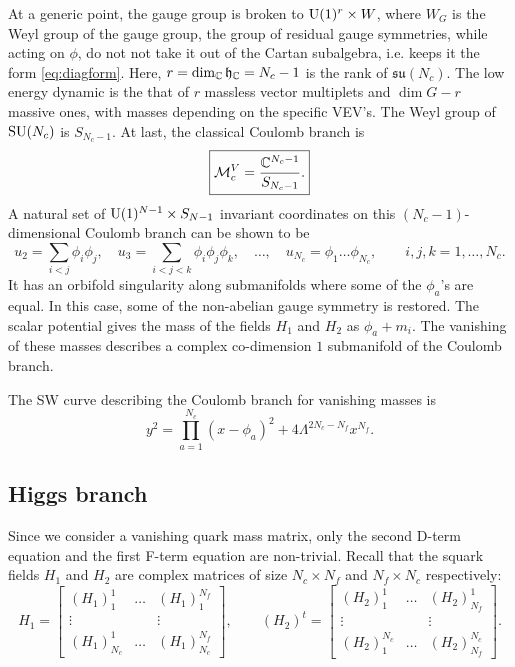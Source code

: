         At a generic point, the gauge group is broken to $\text{U}(1)^r\times W$, where $W_G$ is the Weyl group of the gauge group, the group of residual gauge symmetries, while acting on $\phi$, do not not take it out of the Cartan subalgebra, i.e. keeps it the form \eqref{eq:diagform}. Here, $r=\dim_{\mathbb{C}}\mathfrak{h}_{\mathbb{C}}=N_c-1$ is the rank of $\mathfrak{su}(N_c)$. The low energy dynamic is the that of $r$ massless vector multiplets and $\dim G-r$ massive ones, with masses depending on the specific VEV's. The Weyl group of $\text{SU}(N_c)$ is $S_{N_c-1}$. At last, the classical Coulomb branch is
        \begin{equation}
            \boxed{\mathcal{M}^V_c=\frac{\mathbb{C}^{N_c-1}}{S_{N_c-1}}.}
        \end{equation}
        A natural set of $\text{U}(1)^{N-1}\times S_{N-1}$ invariant coordinates on this $(N_c-1)$-dimensional Coulomb branch can be shown to be
        \begin{equation}
            u_2=\sum_{i<j}\phi_i\phi_j,\quad u_3=\sum_{i<j<k}\phi_i\phi_j\phi_k,\quad \dots,\quad u_{N_c}=\phi_1\dots \phi_{N_c}, \qquad i,j,k=1,\dots,N_c.
        \end{equation}
        It has an orbifold singularity along submanifolds where some of the $\phi_a$'s are equal. In this case, some of the non-abelian gauge symmetry is restored. The scalar potential gives the mass of the fields $H_1$ and $H_2$ as $\phi_a+m_i$. The vanishing of these masses describes a complex co-dimension $1$ submanifold of the Coulomb branch.

        The SW curve describing the Coulomb branch for vanishing masses is
        \begin{equation}
            y^2=\prod^{N_c}_{a=1}(x-\phi_a)^2+4\Lambda^{2N_c-N_f}x^{N_f}.\label{eq:SWcurveCoulombbranch}
        \end{equation}

    \subsection{Higgs branch}

        Since we consider a vanishing quark mass matrix, only the second D-term equation and the first F-term equation are non-trivial. Recall that the squark fields $H_1$ and $H_2$ are complex matrices of size $N_c\times N_f$ and $N_f\times N_c$ respectively:
        \begin{equation}
            H_1=
            \begin{bmatrix}
                (H_1)^1_1 & \dots & (H_1)^{N_f}_1 \\
                \vdots & & \vdots \\
                (H_1)^1_{N_c} & \dots & (H_1)^{N_f}_{N_c}
            \end{bmatrix},\qquad
            (H_2)^t=
            \begin{bmatrix}
                (H_2)^1_1 & \dots & (H_2)^1_{N_f} \\
                \vdots & & \vdots \\
                (H_2)^{N_c}_{1} & \dots & (H_2)^{N_c}_{N_f}
            \end{bmatrix}.
        \end{equation}

